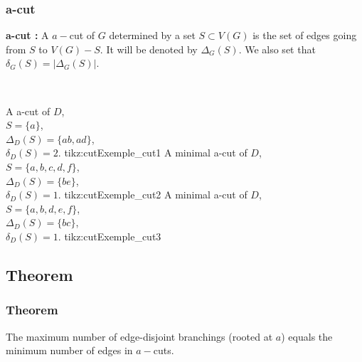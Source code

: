 \documentclass[8pt]{beamer}
\begin{document}
\begin{frame}
\frametitle{a-cut}

\textbf{a-cut :}
A $a-$cut of $G$ determined by a set $S \subset V(G)$ is the set of
edges going from $S$ to $V(G) - S$. 
It will be denoted by $\Delta_G(S)$.
We also set that $\delta_G(S) = |\Delta_G(S)|$.

~

\threesplitpage
{
    {A a-cut of $D$,\\ $S = \{a\}$,\\ $\Delta_D(S)=\{ab, ad\}$,\\ $\delta_D(S) = 2$.}
    {tikz:cutExemple_cut1}
}{
    {A minimal a-cut of $D$,\\ $S = \{a, b, c, d, f\}$,\\ $\Delta_D(S)=\{be\}$,\\ $\delta_D(S) = 1$.}
    {tikz:cutExemple_cut2}
}{
    {A minimal a-cut of $D$,\\ $S = \{a, b, d, e, f\}$,\\ $\Delta_D(S)=\{bc\}$,\\ $\delta_D(S) = 1$.}
    {tikz:cutExemple_cut3}
}

\end{frame}

\subsection{Theorem}
\begin{frame}
\frametitle{Theorem}

\begin{edmonds_theorem}[Edmonds]
The maximum number of edge-disjoint branchings (rooted at $a$) 
equals the minimum number of edges in $a-$cuts.
\end{edmonds_theorem}

\end{frame}

\end{document}
